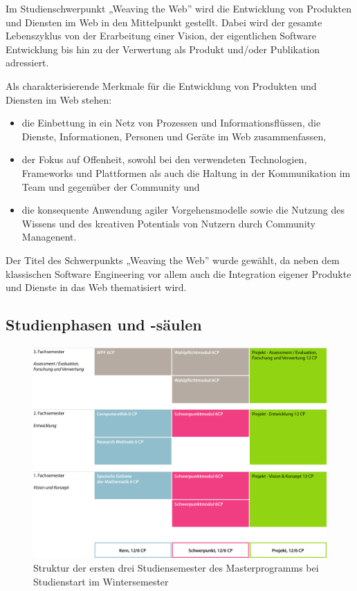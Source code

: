 Im Studienschwerpunkt „Weaving the Web'' wird die Entwicklung von
Produkten und Diensten im Web in den Mittelpunkt gestellt. Dabei wird
der gesamte Lebenszyklus von der Erarbeitung einer Vision, der
eigentlichen Software Entwicklung bis hin zu der Verwertung als Produkt
und/oder Publikation adressiert.

Als charakterisierende Merkmale für die Entwicklung von Produkten und
Diensten im Web stehen:

\begin{itemize}
\tightlist
\item
  die Einbettung in ein Netz von Prozessen und Informationsflüssen, die
  Dienste, Informationen, Personen und Geräte im Web zusammenfassen,
\item
  der Fokus auf Offenheit, sowohl bei den verwendeten Technologien,
  Frameworks und Plattformen als auch die Haltung in der Kommunikation
  im Team und gegenüber der Community und
\item
  die konsequente Anwendung agiler Vorgehensmodelle sowie die Nutzung
  des Wissens und des kreativen Potentials von Nutzern durch Community
  Managenent.
\end{itemize}

Der Titel des Schwerpunkts „Weaving the Web'' wurde gewählt, da neben
dem klassischen Software Engineering vor allem auch die Integration
eigener Produkte und Dienste in das Web thematisiert wird.

\subsection{Studienphasen und
-säulen}\label{studienphasen-und--suxe4ulen-1}

\begin{figure}[htbp]
\centering
\includegraphics[width=\columnwidth]{../anhaenge/bilder/ma-struktur.png}
\caption{Struktur der ersten drei Studiensemester des Masterprogramms
bei Studienstart im Wintersemester}
\end{figure}

